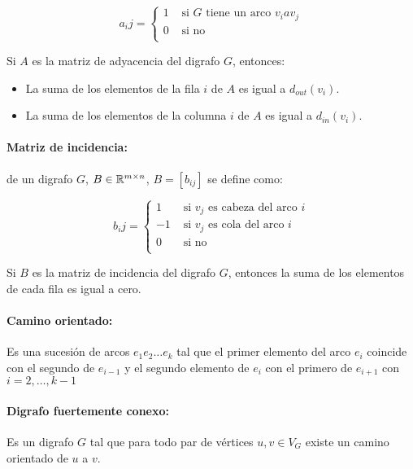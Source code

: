 \[a_ij = \begin{cases}
1 & \text{ si } G \text{ tiene un arco } v_i a v_j \\
0 & \text{ si no } \\
\end{cases}\]

\begin{proposicion}
	Si \(A\) es la matriz de adyacencia del digrafo \(G\), entonces:
	\begin{itemize}
		\item La suma de los elementos de la fila \(i\) de \(A\) es igual a \(d_{out}(v_i)\).
		\item La suma de los elementos de la columna \(i\) de \(A\) es igual a \(d_{in}(v_i)\).
	\end{itemize}
\end{proposicion}

\paragraph{Matriz de incidencia:} de un digrafo \(G\), \(B\in\mathbb{R}^{m\times n}\), \(B = [b_{ij}]\) se define como:

\[b_ij = \begin{cases}
1 & \text{ si } v_j \text{ es cabeza del arco } i \\
-1 & \text{ si } v_j \text{ es cola del arco } i \\
0 & \text{ si no } \\
\end{cases}\]

\begin{proposicion}
	Si \(B\) es la matriz de incidencia del digrafo \(G\), entonces la suma de los elementos de cada fila es igual a cero.
\end{proposicion}

\paragraph{Camino orientado:} Es una sucesión de arcos \(e_1e_2\dots e_k\) tal que el primer elemento del arco \(e_i\) coincide con el segundo de \(e_{i-1}\) y el segundo elemento de \(e_i\) con el primero de \(e_{i+1}\) con \(i = 2,\dots,k-1\)

\paragraph{Digrafo fuertemente conexo:} Es un digrafo \(G\) tal que para todo par de vértices \(u,v\in V_G\) existe un camino orientado de \(u\) a \(v\).
\newpage
\appendix

